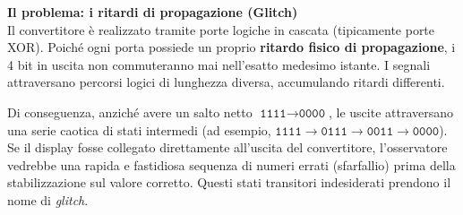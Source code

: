 \documentclass[11pt,a4paper]{report}
\begin{document}
\textbf{Il problema: i ritardi di propagazione (Glitch)}\\
Il convertitore è realizzato tramite porte logiche in cascata (tipicamente porte XOR). Poiché ogni porta possiede un proprio \textbf{ritardo fisico di propagazione}, i 4 bit in uscita non commuteranno mai nell'esatto medesimo istante. I segnali attraversano percorsi logici di lunghezza diversa, accumulando ritardi differenti.

Di conseguenza, anziché avere un salto netto $\texttt{1111} \to \texttt{0000}$, le uscite attraversano una serie caotica di stati intermedi (ad esempio, $\texttt{1111} \to \texttt{0111} \to \texttt{0011} \to \texttt{0000}$). Se il display fosse collegato direttamente all'uscita del convertitore, l'osservatore vedrebbe una rapida e fastidiosa sequenza di numeri errati (sfarfallio) prima della stabilizzazione sul valore corretto. Questi stati transitori indesiderati prendono il nome di \emph{glitch}.

\begin{center}
\end{center}
\end{document}
